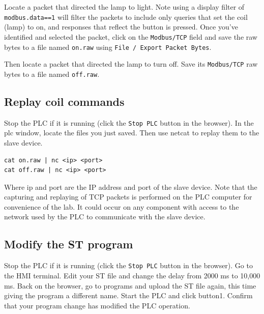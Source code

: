 Locate a packet that directed the lamp to light.  Note using a display filter of {\tt modbus.data==1} will filter the 
packets to include only queries that set the coil (lamp) to on, and responses that reflect the button is pressed.
Once you've identified and selected the packet, click on the {\tt Modbus/TCP} field and save the raw bytes to a file named
{\tt on.raw} using {\tt File / Export Packet Bytes}.  

Then locate a packet that directed the lamp to turn off.  Save its {\tt Modbus/TCP} raw bytes to a file named {\tt off.raw}.

\subsection{Replay coil commands}
Stop the PLC if it is running (click the {\tt Stop PLC} button in the browser).
In the plc window, locate the files you just saved.  Then use netcat to replay them to the slave device.
\begin{verbatim}
cat on.raw | nc <ip> <port>
cat off.raw | nc <ip> <port>
\end{verbatim}
\noindent Where ip and port are the IP address and port of the slave device.
Note that the capturing and replaying of TCP packets is performed on the PLC computer for convenience of the lab.  
It could occur on any component with access to the network used by the PLC to communicate with the slave device.

\subsection{Modify the ST program}
Stop the PLC if it is running (click the {\tt Stop PLC} button in the browser).
Go to the HMI terminal.  
Edit your ST file and change the delay from 2000 ms to 10,000 ms.
Back on the browser, go to programs and upload the ST file again, this time giving the program a different name.
Start the PLC and click button1.  Confirm that your program change has modified the PLC operation.

